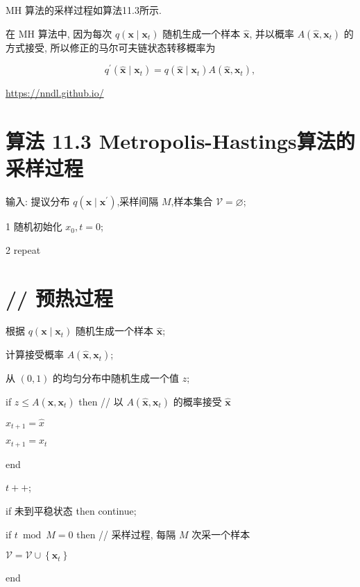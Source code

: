 \documentclass[10pt]{article}
\begin{document}
MH 算法的采样过程如算法11.3所示.

在 $\mathrm{MH}$ 算法中, 因为每次 $q\left(\boldsymbol{x} \mid \boldsymbol{x}_{t}\right)$ 随机生成一个样本 $\hat{\boldsymbol{x}}$, 并以概率 $A\left(\hat{\boldsymbol{x}}, \boldsymbol{x}_{t}\right)$ 的方式接受, 所以修正的马尔可夫链状态转移概率为


\begin{equation*}
q^{\prime}\left(\hat{\boldsymbol{x}} \mid \boldsymbol{x}_{t}\right)=q\left(\hat{\boldsymbol{x}} \mid \boldsymbol{x}_{t}\right) A\left(\hat{\boldsymbol{x}}, \boldsymbol{x}_{t}\right), \tag{11.108}
\end{equation*}


\href{https://nndl.github.io/}{https://nndl.github.io/}

\section*{算法 11.3 Metropolis-Hastings算法的采样过程}
输入: 提议分布 $q\left(\boldsymbol{x} \mid \boldsymbol{x}^{\prime}\right)$,采样间隔 $M$,样本集合 $\mathcal{V}=\varnothing$;

1 随机初始化 $x_{0}, t=0$;

2 repeat

\section*{// 预热过程}
根据 $q\left(\boldsymbol{x} \mid \boldsymbol{x}_{t}\right)$ 随机生成一个样本 $\hat{\boldsymbol{x}}$;

计算接受概率 $A\left(\hat{\boldsymbol{x}}, \boldsymbol{x}_{t}\right)$;

从 $(0,1)$ 的均匀分布中随机生成一个值 $z$;

if $z \leq A\left(\hat{\boldsymbol{x}}, \boldsymbol{x}_{t}\right)$ then // 以 $A\left(\hat{\boldsymbol{x}}, \boldsymbol{x}_{t}\right)$ 的概率接受 $\hat{\boldsymbol{x}}$

$x_{t+1}=\hat{x}$



$x_{t+1}=x_{t}$

end

$t++$;

if 未到平稳状态 then continue;

if $t \bmod M=0$ then // 采样过程, 每隔 $M$ 次采一个样本

$\mathcal{V}=\mathcal{V} \cup\left\{\boldsymbol{x}_{t}\right\}$

end
\end{document}
